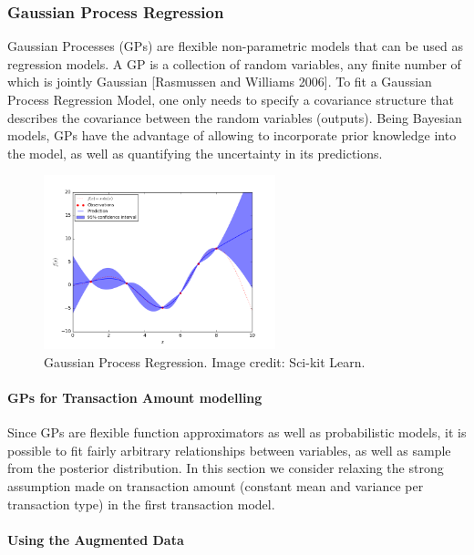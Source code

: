 \documentclass[]{article}
\begin{document}
\subsubsection{Gaussian Process
Regression}\label{gaussian-process-regression}

Gaussian Processes (GPs) are flexible non-parametric models that can be
used as regression models. A GP is a collection of random variables, any
finite number of which is jointly Gaussian {[}Rasmussen and Williams
2006{]}. To fit a Gaussian Process Regression Model, one only needs to
specify a covariance structure that describes the covariance between the
random variables (outputs). Being Bayesian models, GPs have the
advantage of allowing to incorporate prior knowledge into the model, as
well as quantifying the uncertainty in its predictions.

\begin{figure}
\centering
\includegraphics[width=0.6\textwidth]{uploads/plot_gp_regression_001.png}
\caption{Gaussian Process Regression. Image credit: Sci-kit Learn.}
\label{fig:gp_canonical}
\end{figure}

\paragraph{GPs for Transaction Amount
modelling}\label{gps-for-transaction-amount-modelling}

Since GPs are flexible function approximators as well as probabilistic
models, it is possible to fit fairly arbitrary relationships between
variables, as well as sample from the posterior distribution. In this
section we consider relaxing the strong assumption made on transaction
amount (constant mean and variance per transaction type) in the first
transaction model.

\paragraph{Using the Augmented
Data}\label{using-the-augmented-data}
\end{document}
